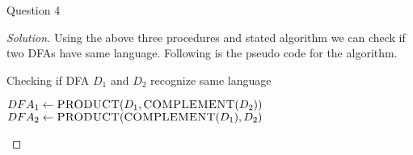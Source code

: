 \begin{solution}{Question 4}
\begin{proof}[Solution]
        Using the above three procedures and stated algorithm we can check if two DFAs have same language. Following is the pseudo code for the algorithm.
        
        \begin{algorithm}[H]
            \caption{Checking if DFA $D_1$ and $D_2$ recognize same language}
            \begin{algorithmic}[1]
                    \State $DFA_1 \gets \textsc{PRODUCT}(D_1, \textsc{COMPLEMENT}(D_2))$
                    \State $DFA_2 \gets \textsc{PRODUCT}(\textsc{COMPLEMENT}(D_1), D_2)$
                    \State 
                    \EndIf{}
                \EndProcedure{}
            \end{algorithmic}
        \end{algorithm}
        
    \end{proof}
\end{solution}
